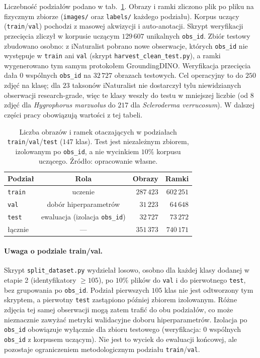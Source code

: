 Liczebność podziałów podano w tab.~\ref{tab:podzial_zbioru}. Obrazy i ramki zliczono plik po pliku na fizycznym zbiorze (\texttt{images/} oraz \texttt{labels/} każdego podziału). Korpus uczący (\texttt{train}/\texttt{val}) pochodzi z masowej akwizycji i auto-anotacji. Skrypt weryfikacji przecięcia zliczył w korpusie uczącym $129\,607$ unikalnych \texttt{obs\_id}. Zbiór testowy zbudowano osobno: z iNaturalist pobrano nowe obserwacje, których \texttt{obs\_id} nie występuje w \texttt{train} ani \texttt{val} (skrypt \texttt{harvest\_clean\_test.py}), a ramki wygenerowano tym samym protokołem GroundingDINO. Weryfikacja przecięcia dała $0$ wspólnych \texttt{obs\_id} na $32\,727$ obrazach testowych. Cel operacyjny to do $250$ zdjęć na klasę; dla $23$ taksonów iNaturalist nie dostarczył tylu niewidzianych obserwacji research-grade, więc te klasy weszły do testu w mniejszej liczbie (od $8$ zdjęć dla \textit{Hygrophorus marzuolus} do $217$ dla \textit{Scleroderma verrucosum}). W dalszej części pracy obowiązują wartości z tej tabeli.

\begin{table}[htbp]
 \centering
 \caption{Liczba obrazów i ramek otaczających w podziałach \texttt{train}/\texttt{val}/\texttt{test} ($147$ klas). Test jest niezależnym zbiorem, izolowanym po \texttt{obs\_id}, a nie wycinkiem $10\%$ korpusu uczącego. Źródło: opracowanie własne.}
 \label{tab:podzial_zbioru}
 \begin{tabular}{|l|c|r|r|}
 \hline
 \textbf{Podział} & \textbf{Rola} & \textbf{Obrazy} & \textbf{Ramki} \\
 \hline \hline
 \texttt{train} & uczenie & $287\,423$ & $602\,251$ \\
 \hline
 \texttt{val} & dobór hiperparametrów & $31\,223$ & $64\,648$ \\
 \hline
 \texttt{test} & ewaluacja (izolacja \texttt{obs\_id}) & $32\,727$ & $73\,272$ \\
 \hline
 łącznie & --- & $351\,373$ & $740\,171$ \\
 \hline
 \end{tabular}
\end{table}

\paragraph{Uwaga o podziale train/val.}
Skrypt \texttt{split\_dataset.py} wydzielał losowo, osobno dla każdej klasy dodanej w etapie 2 (identyfikatory $\ge 105$), po $10\%$ plików do \texttt{val} i do pierwotnego \texttt{test}, bez grupowania po \texttt{obs\_id}. Podział pierwszych $105$ klas nie jest odtworzony tym skryptem, a pierwotny \texttt{test} zastąpiono później zbiorem izolowanym. Różne zdjęcia tej samej obserwacji mogą zatem trafić do obu podziałów, co może nieznacznie zawyżać metryki walidacyjne doboru hiperparametrów. Izolacja po \texttt{obs\_id} obowiązuje wyłącznie dla zbioru testowego (weryfikacja: $0$ wspólnych \texttt{obs\_id} z korpusem uczącym). Nie jest to wyciek do ewaluacji końcowej, ale pozostaje ograniczeniem metodologicznym podziału \texttt{train}/\texttt{val}.

